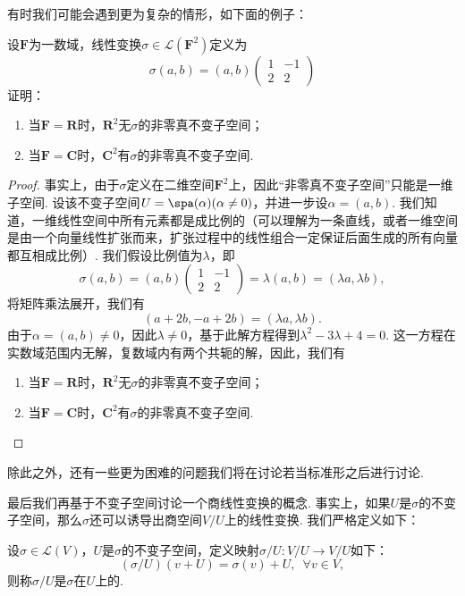 有时我们可能会遇到更为复杂的情形，如下面的例子：
\begin{example} \label{ex:18:不变子空间}
    设$\mathbf{F}$为一数域，线性变换$\sigma\in\mathcal{L}(\mathbf{F}^2)$定义为
    \[\sigma(a,b)=(a,b)\begin{pmatrix}
            1 & -1 \\ 2 & 2
        \end{pmatrix}\]
    证明：
    \begin{enumerate}
        \item 当$\mathbf{F}=\mathbf{R}$时，$\mathbf{R}^2$无$\sigma$的非零真不变子空间；

        \item 当$\mathbf{F}=\mathbf{C}$时，$\mathbf{C}^2$有$\sigma$的非零真不变子空间.
    \end{enumerate}
\end{example}

\begin{proof}
    事实上，由于$\sigma$定义在二维空间$\mathbf{F}^2$上，因此``非零真不变子空间''只能是一维子空间. 设该不变子空间$U=\spa(\alpha)(\alpha\neq 0)$，并进一步设$\alpha=(a,b)$. 我们知道，一维线性空间中所有元素都是成比例的（可以理解为一条直线，或者一维空间是由一个向量线性扩张而来，扩张过程中的线性组合一定保证后面生成的所有向量都互相成比例）. 我们假设比例值为$\lambda$，即
    \[\sigma(a,b)=(a,b)\begin{pmatrix}
            1 & -1 \\ 2 & 2
        \end{pmatrix}=\lambda(a,b)=(\lambda a,\lambda b),\]
    将矩阵乘法展开，我们有
    \[(a+2b,-a+2b)=(\lambda a,\lambda b).\]
    由于$\alpha=(a,b)\neq 0$，因此$\lambda\neq 0$，基于此解方程得到$\lambda^2-3\lambda+4=0$. 这一方程在实数域范围内无解，复数域内有两个共轭的解，因此，我们有
    \begin{enumerate}
        \item 当$\mathbf{F}=\mathbf{R}$时，$\mathbf{R}^2$无$\sigma$的非零真不变子空间；

        \item 当$\mathbf{F}=\mathbf{C}$时，$\mathbf{C}^2$有$\sigma$的非零真不变子空间.
    \end{enumerate}
\end{proof}

除此之外，还有一些更为困难的问题我们将在讨论若当标准形之后进行讨论.

最后我们再基于不变子空间讨论一个商线性变换的概念. 事实上，如果$U$是$\sigma$的不变子空间，那么$\sigma$还可以诱导出商空间$V/U$上的线性变换. 我们严格定义如下：
\begin{definition}
    设$\sigma\in \mathcal{L}(V)$，$U$是$\sigma$的不变子空间，定义映射$\sigma/U:V/U\to V/U$如下：
    \[(\sigma/U)(v+U)=\sigma(v)+U,\enspace\forall v\in V,\]
    则称$\sigma/U$是$\sigma$在$U$上的.
\end{definition}

